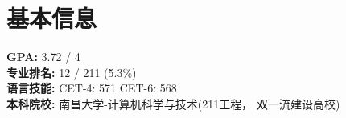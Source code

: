 \documentclass{resume}
\begin{document}









\section{基本信息}
\textbf{GPA: } 3.72 / 4 \\
\textbf{专业排名: } 12 / 211 (5.3\%)  \\
\textbf{语言技能: } CET-4: 571 \quad CET-6: 568 \\
\textbf{本科院校: } 南昌大学-计算机科学与技术(211工程， 双一流建设高校) 

\end{document}
